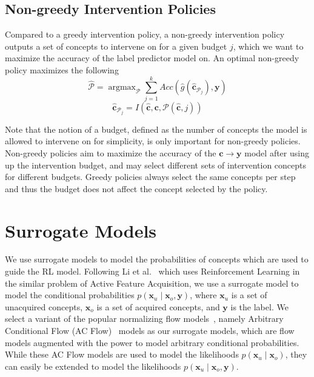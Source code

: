\documentclass[../main.tex]{subfiles}
\begin{document}
\subsection{Non-greedy Intervention Policies}

Compared to a greedy intervention policy, a non-greedy intervention 
policy outputs a set of concepts to intervene on for a given budget $j$,
which we want to maximize the accuracy of the 
label predictor model on. An optimal non-greedy policy maximizes the following
\[\hat{\mathcal{P}} = \mathop{\mathrm{argmax}}_{\mathcal{P}} \sum_{j=1}^k Acc(\hat{g}(\hat{\mathbf{c}}_{\mathcal{P}_j}), \mathbf{y}) \]
\[\hat{\mathbf{c}}_{\mathcal{P}_j} = I(\hat{\mathbf{c}}, \mathbf{c}, \mathcal{P}(\hat{\mathbf{c}}, j))\]

Note that the notion of a budget, defined as the number
of concepts the model is allowed to intervene on for simplicity, is only
important for non-greedy policies. Non-greedy policies aim
to maximize the accuracy of the $\mathbf{c} \to \mathbf{y}$ model after using up the intervention budget,
and may select different sets of intervention concepts 
for different budgets. Greedy policies always select the same
concepts per step and thus the budget does not 
affect the concept selected by the policy.


\section{Surrogate Models}\label{method:surrogate}

We use surrogate models to model the probabilities of concepts which are used
to guide the RL model. Following Li et al.~\cite{afa} which uses Reinforcement Learning
in the similar problem of Active Feature Acquisition, we use a surrogate model to model
the conditional probabilities $p(\mathbf{x}_u \mid \mathbf{x}_o, \mathbf{y})$, 
where $\mathbf{x}_u$ is a set of unacquired concepts, $\mathbf{x}_o$ is a set of acquired concepts,
and $\mathbf{y}$ is the label. We select a variant of the popular normalizing flow models~\cite{normalizing-flows},
namely Arbitrary Conditional Flow (AC Flow)~\cite{acflow}
models as our surrogate models, 
which are flow models augmented with the power to model arbitrary conditional probabilities.
While these AC Flow models are used to model the likelihoods
$p(\mathbf{x}_u \mid \mathbf{x}_o)$, they can easily be extended to model the 
likelihoods
$p(\mathbf{x}_u \mid \mathbf{x}_o, \mathbf{y})$.
\end{document}
